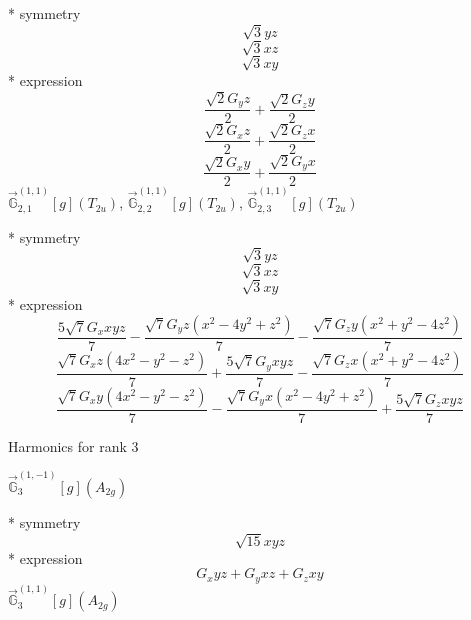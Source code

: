 \documentclass[fleqn,8pt]{jsarticle}
\begin{document}
\noindent\quad ** symmetry
\begin{dmath*}
\sqrt{3} y z
\end{dmath*}
\begin{dmath*}
\sqrt{3} x z
\end{dmath*}
\begin{dmath*}
\sqrt{3} x y
\end{dmath*}
\noindent\quad ** expression
\begin{dmath*}
\frac{\sqrt{2} G_{y} z}{2} + \frac{\sqrt{2} G_{z} y}{2}
\end{dmath*}
\begin{dmath*}
\frac{\sqrt{2} G_{x} z}{2} + \frac{\sqrt{2} G_{z} x}{2}
\end{dmath*}
\begin{dmath*}
\frac{\sqrt{2} G_{x} y}{2} + \frac{\sqrt{2} G_{y} x}{2}
\end{dmath*}
\noindent\quad $\vec{\mathbb{G}}_{2,1}^{(1,1)}[g](T_{2u})$, $\vec{\mathbb{G}}_{2,2}^{(1,1)}[g](T_{2u})$, $\vec{\mathbb{G}}_{2,3}^{(1,1)}[g](T_{2u})$

\noindent\quad ** symmetry
\begin{dmath*}
\sqrt{3} y z
\end{dmath*}
\begin{dmath*}
\sqrt{3} x z
\end{dmath*}
\begin{dmath*}
\sqrt{3} x y
\end{dmath*}
\noindent\quad ** expression
\begin{dmath*}
\frac{5 \sqrt{7} G_{x} x y z}{7} - \frac{\sqrt{7} G_{y} z \left(x^{2} - 4 y^{2} + z^{2}\right)}{7} - \frac{\sqrt{7} G_{z} y \left(x^{2} + y^{2} - 4 z^{2}\right)}{7}
\end{dmath*}
\begin{dmath*}
\frac{\sqrt{7} G_{x} z \left(4 x^{2} - y^{2} - z^{2}\right)}{7} + \frac{5 \sqrt{7} G_{y} x y z}{7} - \frac{\sqrt{7} G_{z} x \left(x^{2} + y^{2} - 4 z^{2}\right)}{7}
\end{dmath*}
\begin{dmath*}
\frac{\sqrt{7} G_{x} y \left(4 x^{2} - y^{2} - z^{2}\right)}{7} - \frac{\sqrt{7} G_{y} x \left(x^{2} - 4 y^{2} + z^{2}\right)}{7} + \frac{5 \sqrt{7} G_{z} x y z}{7}
\end{dmath*}

\noindent * Harmonics for rank 3

\noindent\quad $\vec{\mathbb{G}}_{3}^{(1,-1)}[g](A_{2g})$

\noindent\quad ** symmetry
\begin{dmath*}
\sqrt{15} x y z
\end{dmath*}
\noindent\quad ** expression
\begin{dmath*}
G_{x} y z + G_{y} x z + G_{z} x y
\end{dmath*}
\noindent\quad $\vec{\mathbb{G}}_{3}^{(1,1)}[g](A_{2g})$
\end{document}
